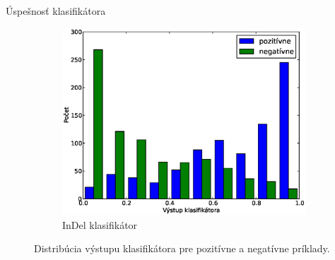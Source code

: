 \documentclass[xcolor=dvipsnames, compress, 12pt]{beamer}
\theoremstyle{definition}
\begin{document}
\begin{frame}{Úspešnosť klasifikátora}
\begin{figure}[h]
\begin{subfigure}[b]{0.35\textwidth}
                \includegraphics[width=\textwidth]{images/randomforest_combined_5_indel_test}
                \caption{InDel klasifikátor}
        \end{subfigure}
        \caption{Distribúcia výstupu klasifikátora pre pozitívne a negatívne príklady.}
\end{figure}
\end{frame}
\end{document}

